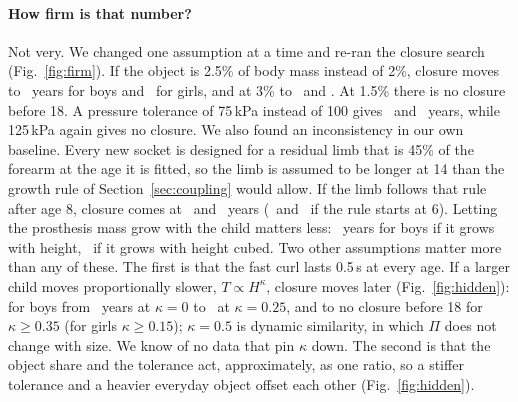 \documentclass[11pt]{article}
\begin{document}
\paragraph{How firm is that number?} Not very. We changed one assumption at a time and re-ran the closure search (Fig.~\ref{fig:firm}). If the object is 2.5\% of body mass instead of 2\%, closure moves to \sensLoadHighBoy\ years for boys and \sensLoadHighGirl\ for girls, and at 3\% to \sensLoadTopBoy\ and \sensLoadTopGirl. At 1.5\% there is no closure before 18. A pressure tolerance of 75\,kPa instead of 100 gives \sensTolLowBoy\ and \sensTolLowGirl\ years, while 125\,kPa again gives no closure. We also found an inconsistency in our own baseline. Every new socket is designed for a residual limb that is 45\% of the forearm at the age it is fitted, so the limb is assumed to be longer at 14 than the growth rule of Section~\ref{sec:coupling} would allow. If the limb follows that rule after age 8, closure comes at \sensLimbEightBoy\ and \sensLimbEightGirl\ years (\sensLimbSixBoy\ and \sensLimbSixGirl\ if the rule starts at 6). Letting the prosthesis mass grow with the child matters less: \sensMassBoy\ years for boys if it grows with height, \sensMassCubeBoy\ if it grows with height cubed. Two other assumptions matter more than any of these. The first is that the fast curl lasts 0.5\,s at every age. If a larger child moves proportionally slower, $T\propto H^{\kappa}$, closure moves later (Fig.~\ref{fig:hidden}): for boys from \kappaZeroBoy\ years at $\kappa=0$ to \kappaQuarterBoy\ at $\kappa=0.25$, and to no closure before 18 for $\kappa\ge0.35$ (for girls $\kappa\ge0.15$); $\kappa=0.5$ is dynamic similarity, in which $\Pi$ does not change with size. We know of no data that pin $\kappa$ down. The second is that the object share and the tolerance act, approximately, as one ratio, so a stiffer tolerance and a heavier everyday object offset each other (Fig.~\ref{fig:hidden}).
\end{document}
